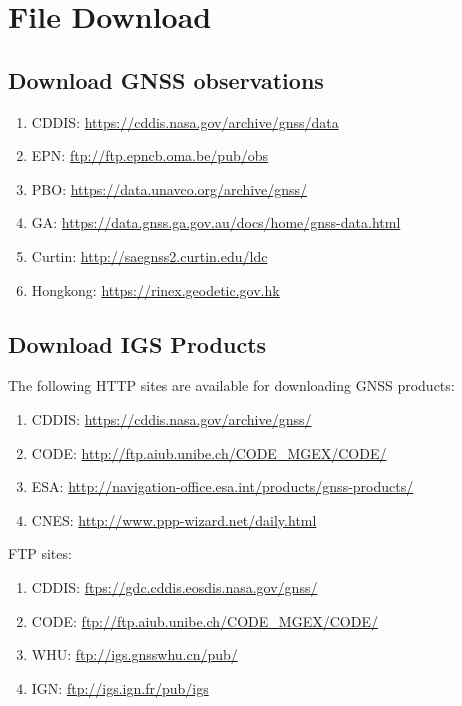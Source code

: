 \section{File Download}

\subsection{Download GNSS observations}

\begin{enumerate}
    \item CDDIS: \url{https://cddis.nasa.gov/archive/gnss/data}
    \item EPN: \url{ftp://ftp.epncb.oma.be/pub/obs}
    \item PBO: \url{https://data.unavco.org/archive/gnss/}
    \item GA: \url{https://data.gnss.ga.gov.au/docs/home/gnss-data.html}
    \item Curtin: \url{http://saegnss2.curtin.edu/ldc}
    \item Hongkong: \url{https://rinex.geodetic.gov.hk}
\end{enumerate}



\subsection{Download IGS Products}

The following HTTP sites are available for downloading GNSS products:
\begin{enumerate}
    \item CDDIS: \url{https://cddis.nasa.gov/archive/gnss/}
    \item CODE: \url{http://ftp.aiub.unibe.ch/CODE_MGEX/CODE/}
    \item ESA: \url{http://navigation-office.esa.int/products/gnss-products/}
    \item CNES: \url{http://www.ppp-wizard.net/daily.html}
\end{enumerate}


FTP sites:
\begin{enumerate}
    \item CDDIS: \url{ftps://gdc.cddis.eosdis.nasa.gov/gnss/}
    \item CODE: \url{ftp://ftp.aiub.unibe.ch/CODE_MGEX/CODE/}
    \item WHU: \url{ftp://igs.gnsswhu.cn/pub/}
    \item IGN: \url{ftp://igs.ign.fr/pub/igs}
\end{enumerate}

